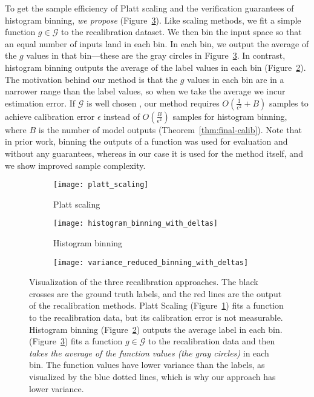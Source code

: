 To get the sample efficiency of Platt scaling and the verification guarantees of histogram binning, \emph{we propose \ourcal{}} (Figure~\ref{fig:var_red_binning}).
Like scaling methods, we fit a simple function $g \in \mathcal{G}$ to the recalibration dataset.
We then bin the input space so that an equal number of inputs land in each bin.
In each bin, we output the average of the $g$ values in that bin---these are the gray circles in Figure~\ref{fig:var_red_binning}.
In contrast, histogram binning outputs the average of the label values in each bin (Figure~\ref{fig:hist_binning}).
The motivation behind our method is that the $g$ values in each bin are in a narrower range than the label values, so when we take the average we incur   estimation error.
If $\mathcal{G}$ is well chosen , our method requires $O(\frac{1}{\epsilon^2} + B)$ samples to achieve calibration error $\epsilon$ instead of $O(\frac{B}{\epsilon^2})$ samples for histogram binning, where $B$ is the number of model outputs (Theorem~\ref{thm:final-calib}). Note that in prior work, binning the outputs of a function was used for evaluation and without any guarantees, whereas in our case it is used for the method itself, and we show improved sample complexity.

\begin{figure}
     \centering
     \begin{subfigure}[b]{0.32\textwidth}
         \centering
         \texttt{[image: platt\_scaling]}
         \caption{Platt scaling}
         \label{fig:platt_scaling}
     \end{subfigure}
     \hfill
     \begin{subfigure}[b]{0.32\textwidth}
         \centering
         \texttt{[image: histogram\_binning\_with\_deltas]}
         \caption{Histogram binning}
         \label{fig:hist_binning}
     \end{subfigure}
     \hfill
     \begin{subfigure}[b]{0.32\textwidth}
         \centering
         \texttt{[image: variance\_reduced\_binning\_with\_deltas]}
         \caption{\Ourcal{} }
         \label{fig:var_red_binning}
     \end{subfigure}
        \caption{
        Visualization of the three recalibration approaches.
        The black crosses are the ground truth labels, and the red lines are the output of the recalibration methods.
        Platt Scaling (Figure~\ref{fig:platt_scaling}) fits a function to the recalibration data, but its calibration error is not measurable.
        Histogram binning (Figure~\ref{fig:hist_binning}) outputs the average label in each bin.
        \Ourcal{} (Figure~\ref{fig:var_red_binning}) fits a function $g \in \mathcal{G}$ to the recalibration data and then \emph{takes the average of the function values (the gray circles)} in each bin.
        The function values have lower variance than the labels, as visualized by the blue dotted lines, which is why our approach has lower variance.
        }
        \label{fig:variance_reduced_illustration}
\end{figure}

